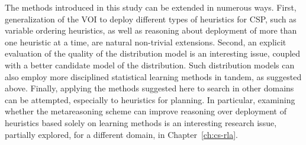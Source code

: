 The methods introduced in this study can be extended in numerous
ways. First, generalization of the VOI to deploy different types of
heuristics for CSP, such as variable ordering heuristics, as well as
reasoning about deployment of more than one heuristic at a time, are
natural non-trivial extensions. Second, an explicit evaluation of the
quality of the distribution model is an interesting issue, coupled
with a better candidate model of the distribution.  Such distribution
models can also employ more disciplined statistical learning methods
in tandem, as suggested above. Finally, applying the methods suggested
here to search in other domains can be attempted, especially
to heuristics for planning.  In particular, examining whether
the metareasoning scheme can improve reasoning over deployment of
heuristics based solely on learning methods is an interesting
research issue, partially explored, for a different domain,
in Chapter~\ref{ch:cs-rla}.
